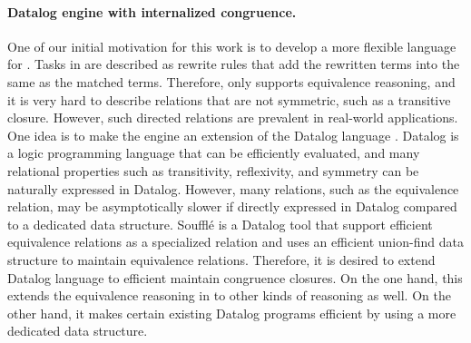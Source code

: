 \paragraph{Datalog engine with internalized congruence.} 
One of our initial motivation for this work is to develop a more flexible language for \egg. Tasks in \egg are described as rewrite rules that add the rewritten terms into the same \eclass as the matched terms. Therefore, \egg only supports equivalence reasoning, and it is very hard to describe relations that are not symmetric, such as a transitive closure. However, such directed relations are prevalent in real-world applications. One idea is to make the \egraph engine an extension of the Datalog language \citep{datalog-survey}. Datalog is a logic programming language that can be efficiently evaluated, and many relational properties such as transitivity, reflexivity, and symmetry can be naturally expressed in Datalog.
However, many relations, such as the equivalence relation, may be asymptotically slower if directly expressed in Datalog compared to a dedicated data structure.
Souffl\'e is a Datalog tool that support efficient equivalence relations as a specialized relation and uses an efficient union-find data structure to maintain equivalence relations.
Therefore, it is desired to extend Datalog language to efficient maintain congruence closures. On the one hand, this extends the equivalence reasoning in \egraphs to other kinds of reasoning as well. On the other hand, it makes certain existing Datalog programs efficient by using a more dedicated data structure.
